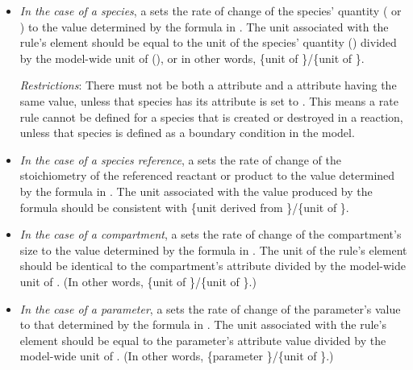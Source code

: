 \begin{itemize}
  
\item \emph{In the case of a species}, a \RateRule sets the rate
  of change of the species' quantity ( or
  ) to the value determined by the formula in
  .  The unit associated with the rule's 
  element should be equal to the unit of the species' quantity
  () divided by the model-wide unit
  of  (), or in other
  words, \{unit of \}/\{unit of
  \}.

  \emph{Restrictions}: There must not be both a \RateRule
   attribute and a \SpeciesReference {}
  attribute having the same value, unless that species has its
   attribute is set to .  This
  means a rate rule cannot be defined for a species that is
  created or destroyed in a reaction, unless that species is
  defined as a boundary condition in the model.

\item \emph{In the case of a species reference}, a \RateRule sets
  the rate of change of the stoichiometry of the referenced
  reactant or product to the value determined by the formula in
  .  The unit associated with the value produced by
  the formula should be consistent with \{unit derived from
  \}/\{unit of \}.
  
\item \emph{In the case of a compartment}, a \RateRule sets the
  rate of change of the compartment's size to the value determined
  by the formula in .  The unit of the rule's
   element should be identical to the compartment's
   attribute divided by the model-wide unit of
  .  (In other words, \{unit of
  \}/\{unit of \}.)

\item \emph{In the case of a parameter}, a \RateRule sets the rate
  of change of the parameter's value to that determined by the
  formula in .  The unit associated with the rule's
   element should be equal to the parameter's
   attribute value divided by the model-wide unit of
  .  (In other words, \{parameter
  \}/\{unit of \}.)


\end{itemize}


